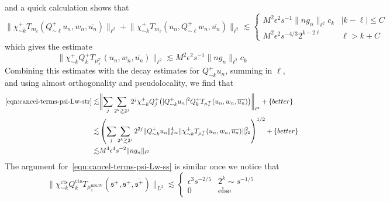 \documentclass[letterpaper, reqno,final]{amsart}
\newcommand{\cT}{\mathcal{T}}
\newcommand{\fs}{\mathfrak{s}}
\newcommand{\tmkdv}{\text{mKdV}}
\newcommand{\tcts}{\text{cts}}
\newcommand{\btext}[1]{\left\{\textup{#1}\right\}}
\newcommand{\bbetter}{\btext{better}}
\begin{document}
and a quick calculation shows that
\begin{equation*}
    \lVert \chi_{\sim k}^+ T_{m_\ell}(Q_{\sim \ell}^+ u_n, w_n, \overline{u_n}) \rVert_{\ell^2} + \lVert \chi_{\sim k}^+ T_{m_\ell}(u_n, Q_{\sim \ell}^+ w_n, \overline{u_n}) \rVert_{\ell^2} \lesssim \begin{cases}
        M^2\epsilon^2 s^{-1} \lVert n g_n \rVert_{\ell^2} c_k & |k - \ell| \leq C\\
        M^2\epsilon^2 s^{-4/3} 2^{k - 2\ell} & \ell > k + C
    \end{cases}
\end{equation*}
which gives the estimate
\begin{equation}
    \lVert \chi_{\sim k}^+ Q_k^+ T_{\mu_s^\cT}(u_n, w_n, \overline{u_n}) \rVert_{\ell^2} \lesssim M^2 \epsilon^2 s^{-1} \lVert ng_n \rVert_{\ell^2} c_k
\end{equation}
Combining this estimates with the decay estimates for $Q_{\sim k}^+ u_n$, summing in $\ell$, and using almost orthogonality and pseudolocality, we find that
\begin{equation*}\begin{split}
    \eqref{eqn:cancel-terms-psi-Lw-str}\lesssim& \biggl\lVert\sum_{j} \sum_{2^k \gtrsim 2^j} 2^j \chi_{\sim k}^+ Q_j^+\bigl(  |Q_{\sim k}^+ u_n|^2 Q_k^+ T_{\mu_s^\cT}(u_n, w_n, \overline{u_n})\bigr) \biggr\rVert_{\ell^2} + \bbetter\\
    \lesssim& \left(\sum_{j} \sum_{2^k \gtrsim 2^j} 2^{2j} \lVert Q^+_{\sim k} u_n \rVert_{\ell^\infty}^4 \lVert \chi_{\sim k}^+ T_{\mu_s^\cT}(u_n, w_n, \overline{u_n})\rVert_{\ell^2}^2\right)^{1/2} + \bbetter\\
    \lesssim& M^4 \epsilon^4 s^{-2} \lVert ng_n \rVert_{\ell^2}
\end{split}\end{equation*}
The argument for~\eqref{eqn:cancel-terms-psi-Lw-ss} is similar once we notice that
\begin{equation*}
    \lVert \chi_{\sim k}^\tcts Q_k^\tcts T_{\mu_s^\tmkdv}(\fs^+, \fs^+, \overline{\fs^+}) \rVert_{L^2} \lesssim \begin{cases}
        \epsilon^3 s^{-2/5} & 2^k \sim s^{-1/5}\\
        0 & \text{else}
        \end{cases}
\end{equation*}
\end{document}
